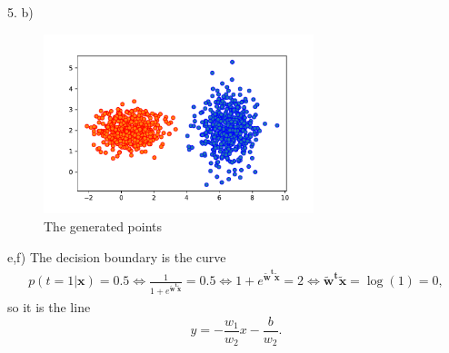 \documentclass[english]{exercisesheet}
\begin{document}
\begin{solution}
\par 5. b)
\begin{figure}[h]
\centering
 \includegraphics[width=0.7\textwidth]{points.pdf}
 \caption{The generated points}
\end{figure}

\par e,f) The decision boundary is the curve
\begin{align*}
 p(t=1|\bm{x})=0.5 \Leftrightarrow \frac{1}{1+e^{\bm{\tilde{w}^t\tilde{x}}}}=0.5\Leftrightarrow 1+e^{\bm{\tilde{w}^t\tilde{x}}}=2\Leftrightarrow \bm{\tilde{w}^t\tilde{x}}=\log(1)=0,
\end{align*}
so it is the line
\begin{equation*}
 y=-\frac{w_1}{w_2}x-\frac{b}{w_2}.
\end{equation*}


\end{solution}
\end{document}
